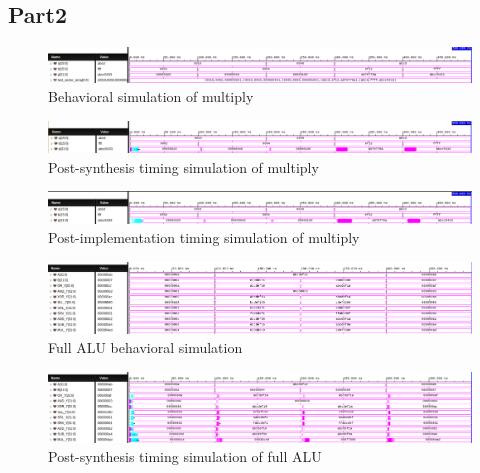\documentclass[CMPE]{../KGCOEReport}
\begin{document}
    \subsection*{Part2}
	\begin{figure}[h!]
        \centering
        \includegraphics[width=\textwidth]{img/mult_behav}
        \caption{Behavioral simulation of multiply}
        \label{fig:demo1}
	\end{figure}
	\begin{figure}[h!]
        \centering
        \includegraphics[width=\textwidth]{img/mult_synth}
        \caption{Post-synthesis timing simulation of multiply}
        \label{fig:demo1}
	\end{figure}
	\begin{figure}[h!]
        \centering
        \includegraphics[width=\textwidth]{img/mult_impl}
        \caption{Post-implementation timing simulation of multiply}
        \label{fig:demo1}
	\end{figure}
	\begin{figure}[h!]
        \centering
        \includegraphics[width=\textwidth]{img/alu_full_behav}
        \caption{Full ALU behavioral simulation}
        \label{fig:demo1}
	\end{figure}
	\begin{figure}[h!]
        \centering
        \includegraphics[width=\textwidth]{img/alu_full_synth}
        \caption{Post-synthesis timing simulation of full ALU}
        \label{fig:demo1}
	\end{figure}
\end{document}
